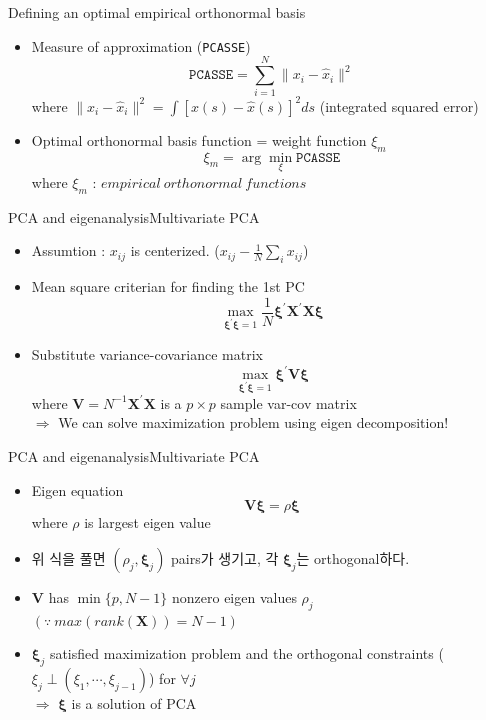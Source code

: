 \documentclass{beamer}
\begin{document}
\begin{frame}{Defining an optimal empirical orthonormal basis}
	\begin{itemize}
		\item {
			Measure of approximation (\texttt{PCASSE})
			$$ \texttt{PCASSE} = \sum_{i=1}^N \lVert x_i-\hat{x}_i \rVert^2 $$	
			where $ \lVert x_i-\hat{x}_i \rVert^2=\int [x(s) - \hat{x}(s)]^2 ds $ (integrated squared error)	
		}
		\item {
			Optimal orthonormal basis function = weight function $\xi_m$
			$$ \xi_m = \arg\min_\xi \texttt{PCASSE} $$
			where $\xi_m$ : $empirical \ orthonormal \ functions$
		}
	\end{itemize}
\end{frame}

\begin{frame}{PCA and eigenanalysis}{Multivariate PCA}
	\begin{itemize}
		\item {
			Assumtion : $x_{ij}$ is centerized. ($x_{ij} - \frac{1}{N}\sum_i x_{ij}$)
		}
		\item {
			Mean square criterian for finding the 1st PC
			$$ \max_{\boldsymbol{\xi^{'}\xi}=1}\frac{1}{N} \boldsymbol{\xi^{'}X^{'}X\xi} $$
		}
		\item {
			Substitute variance-covariance matrix
			$$\max_{\boldsymbol{\xi^{'}\xi}=1} \boldsymbol{\xi^{'}V\xi} $$
			where $\boldsymbol{V} = N^{-1}\boldsymbol{X^{'}X} $ is a $p \times p$ sample var-cov matrix\\
			$\Rightarrow$ We can solve maximization problem using eigen decomposition!
		}
	\end{itemize}
\end{frame}

\begin{frame}{PCA and eigenanalysis}{Multivariate PCA}
	\begin{itemize}
		\item {
			Eigen equation
			$$ \boldsymbol{V\xi} = \rho\boldsymbol{\xi} $$
			where $ \rho $ is largest eigen value
		}
		\item {
			위 식을 풀면 $ (\rho_j,\boldsymbol{\xi}_j) $ pairs가 생기고, 각 $\boldsymbol{\xi}_j$는 orthogonal하다.
		}
		\item {
			$\boldsymbol{V}$ has $\min\{p,N-1\}$ nonzero eigen values $\rho_j$\\
			$(\because \ max(rank(\boldsymbol{X}))=N-1)$
		}	
		\item {
			$\boldsymbol{\xi}_j$ satisfied maximization problem and the orthogonal constraints ($\xi_j \perp (\xi_1, \cdots, \xi_{j-1}) $) for $\forall j$\\
			$\Rightarrow$ $\boldsymbol{\xi}$ is a solution of PCA
		}
	\end{itemize}
\end{frame}
\end{document}

